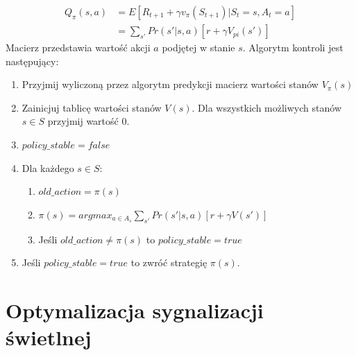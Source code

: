 \documentclass[12pt]{book}
\theoremstyle{plain}
\begin{document}
\begin{equation}
\begin{split}
Q_{\pi}(s,a) &= E[R_{t+1}+\gamma v_{\pi}(S_{t+1}) | S_t=s, A_t=a]  \\
           &= \sum_{s'}Pr(s'|s,a)[r+\gamma V_{pi}(s')] 
\end{split}
\end{equation}
Macierz przedstawia wartość akcji $a$ podjętej w stanie $s$. Algorytm kontroli jest następujący:
\begin{enumerate}
\item{Przyjmij wyliczoną przez algorytm predykcji macierz wartości stanów $V_{\pi}(s)$}
\item{Zainicjuj tablicę wartości stanów $V(s)$. Dla wszystkich możliwych stanów $s \in S$ przyjmij wartość $0$.}
\item{$policy\_stable=false$}
\item{Dla każdego $s \in S$:}
  \begin{enumerate}
    \item $old\_action=\pi(s)$
    \item $\pi(s)=argmax_{a\in A_s} \sum_{s'}Pr(s'|s,a)[r+\gamma V(s')]$
    \item Jeśli $old\_action \neq \pi(s)$ to $policy\_stable = true$
  \end{enumerate}
\item Jeśli $policy\_stable=true$ to zwróć strategię $\pi(s)$.
\end{enumerate}

\chapter{Optymalizacja sygnalizacji świetlnej}

\end{document}
